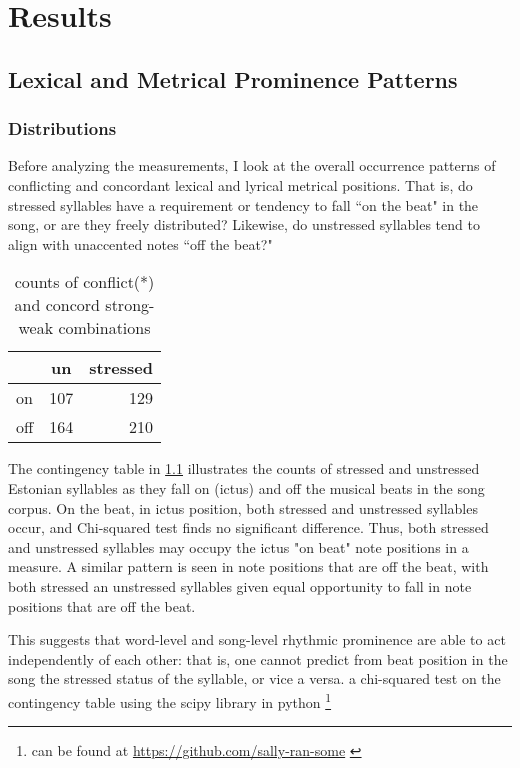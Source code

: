 \chapter{Results}
%

\section{Lexical and Metrical Prominence Patterns}
\subsection{Distributions}

Before analyzing the measurements, I look at the overall occurrence patterns of conflicting and concordant lexical and lyrical metrical positions. That is, do stressed syllables have a requirement or tendency to fall ``on the beat" in the song, or are they freely distributed? Likewise, do unstressed syllables tend to align with unaccented notes ``off the beat?" 


\begin{table}[ht]
\centering
\begin{tabular}{lcr}
\hline
 & un &   stressed \\
\hline
on  &   107 & 129 \\
off     &  164 & 210 \\
\hline
\end{tabular}
\label{contin}
\caption{counts of conflict(*) and concord strong-weak combinations}
\end{table}

The contingency table in \ref{contin} illustrates the counts of stressed and unstressed Estonian syllables as they fall on (ictus) and off the musical beats in the song corpus. On the beat, in ictus position, both stressed and unstressed syllables occur, and Chi-squared test finds no significant difference. Thus, both stressed and unstressed syllables may occupy the ictus "on beat" note positions in a measure. A similar pattern is seen in note positions that are off the beat, with both stressed an unstressed syllables given equal opportunity to fall in note positions that are off the beat. 

This suggests that word-level and song-level rhythmic prominence are able to act independently of each other: that is, one cannot predict from beat position in the song the stressed status of the syllable, or vice a versa. 
a chi-squared test on the contingency table using the scipy library in python \citep{2020SciPy-NMeth, mckinney-proc-scipy-2010}\footnote{\citep{reback2020pandas} can be found at \url{https://github.com/sally-ran-some} \citep{Kluyver2016jupyter}}


